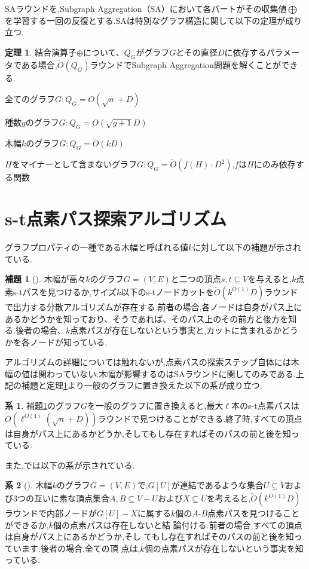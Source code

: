 \documentclass{thesis}
\theoremstyle{definition}
\newtheorem{theorem}{定理}
\newtheorem{lemma}{補題}
\newtheorem{corollary}{系}
\begin{document}
SAラウンドを,Subgraph Aggregation（SA）において各パートがその収集値$\bigoplus$を学習する一回の反復とする.SAは特別なグラフ構造に関して以下の定理が成り立つ.

\begin{theorem} \label{SA}
    結合演算子$\oplus$について、$Q_G$がグラフ$G$とその直径$D$に依存するパラメータである場合,$\tilde{O}(Q_G)$ラウンドでSubgraph Aggregation問題を解くことができる.
    \item 全てのグラフ$G:Q_G = O(\sqrt{n}+D)$
    \item 種数$g$のグラフ$G:Q_G=O(\sqrt{g+1}D)$
    \item 木幅$k$のグラフ$G:Q_G=\tilde{O}(kD)$
    \item $H$をマイナーとして含まないグラフ$G:Q_G=\tilde{O}(f(H)\cdot D^2)$,$f$は$H$にのみ依存する関数
\end{theorem}

\section{s-t点素パス探索アルゴリズム}
グラフプロパティの一種である木幅と呼ばれる値$k$に対して以下の補題が示されている.

\begin{lemma}[\cite{li2018distributed}] \label{path}
    木幅が高々$k$のグラフ$G=(V,E)$と二つの頂点$s,t\subseteq V$を与えると,$k$点素s-tパスを見つけるか,サイズ$k$以下のs-tノードカットを$\tilde{O}(k^{O(1)}D)$ラウンドで出力する分散アルゴリズムが存在する.前者の場合,各ノードは自身がパス上にあるかどうかを知っており、そうであれば、そのパス上のその前方と後方を知る.後者の場合、$k$点素パスが存在しないという事実と,カットに含まれるかどうかを各ノードが知っている.
\end{lemma}

 アルゴリズムの詳細については触れないが,点素パスの探索ステップ自体には木幅の値は関わっていない.木幅が影響するのはSAラウンドに関してのみである.上記の補題と定理\ref{SA}より一般のグラフに置き換えた以下の系が成り立つ.

\begin{corollary}
    補題\ref{path}のグラフ$G$を一般のグラフに置き換えると,最大$\ell$本のs-t点素パスは$\tilde{O}(\ell^{O(1)}(\sqrt{n}+D))$ラウンドで見つけることができる.終了時,すべての頂点は自身がパス上にあるかどうか,そしてもし存在すればそのパスの前と後を知っている.
\end{corollary}

また,\cite{li2018distributed}では以下の系が示されている.

\begin{corollary}[\cite{li2018distributed}] \label{A-Bpath}
    木幅$k$のグラフ$G =(V,E)$で,$G[U]$が連結であるような集合$U \subseteq V$およ
    び3つの互いに素な頂点集合$A,B \subseteq V - U$および$X \subseteq U$を考えると,$\tilde{O}(k^{O(1)}D)$ラウンドで内部ノードが$G[U] - X$に属する$k$個の$A$-$B$点素パスを見つけることができるか,$k$個の点素パスは存在しないと結
    論付ける.前者の場合,すべての頂点は自身がパス上にあるかどうか,そし
    てもし存在すればそのパスの前と後を知っています.後者の場合,全ての頂
    点は,$k$個の点素パスが存在しないという事実を知っている.
\end{corollary}
\end{document}
